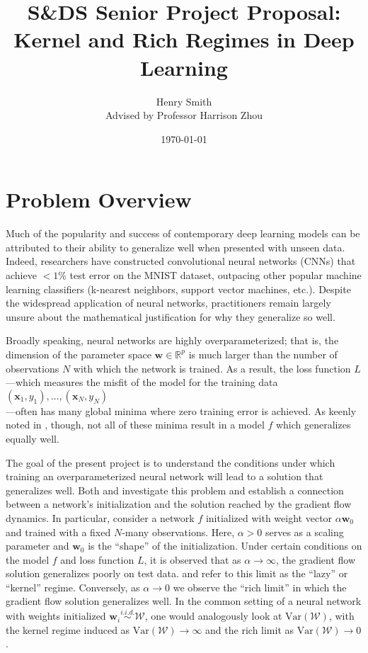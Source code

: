 \documentclass{article}
\title{\textbf{S\&DS Senior Project Proposal: \\Kernel and Rich Regimes in Deep Learning}}
\author[]{Henry Smith \\
Advised by Professor Harrison Zhou}
\affil[]{\normalsize Yale University}
\date{\today}
\begin{document}
\maketitle

\section{Problem Overview}
Much of the popularity and success of contemporary deep learning models can be attributed to their ability to generalize well when presented with unseen data. Indeed, researchers have constructed convolutional neural networks (CNNs) that achieve $< 1$\% test error on the MNIST dataset, outpacing other popular machine learning classifiers (k-nearest neighbors, support vector machines, etc.). Despite the widespread application of neural networks, practitioners remain largely unsure about the mathematical justification for why they generalize so well. 

Broadly speaking, neural networks are highly overparameterized; that is, the dimension of the parameter space $\boldsymbol{w} \in \mathbb{R}^p$ is much larger than the number of observations $N$ with which the network is trained. As a result, the loss function $L$—which measures the misfit of the model for the training data $(\boldsymbol{x}_1, y_1), \ldots, (\boldsymbol{x}_N, y_N)$\\—often has many global minima where zero training error is achieved. As keenly noted in \cite{woodworth2020kernel}, though, not all of these minima result in a model $f$ which generalizes equally well.

The goal of the present project is to understand the conditions under which training an overparameterized neural network will lead to a solution that generalizes well. Both \cite{chizat2018lazy} and \cite{woodworth2020kernel} investigate this problem and establish a connection between a network's initialization and the solution reached by the gradient flow dynamics. In particular, consider a network $f$ initialized with weight vector $\alpha \boldsymbol{w}_0$ and trained with a fixed $N$-many observations. Here, $\alpha > 0$ serves as a scaling parameter and $\boldsymbol{w}_0$ is the \enquote{shape} of the initialization. Under certain conditions on the model $f$ and loss function $L$, it is observed that as $\alpha \rightarrow \infty$, the gradient flow solution generalizes poorly on test data. \cite{chizat2018lazy} and \cite{woodworth2020kernel} refer to this limit as the \enquote{lazy} or \enquote{kernel} regime. Conversely, as $\alpha \rightarrow 0$ we observe the \enquote{rich limit} in which the gradient flow solution generalizes well. In the common setting of a neural network with weights initialized $\boldsymbol{w}_i \overset{i.i.d.}{\sim} \mathcal{W}$, one would analogously look at $\text{Var}(\mathcal{W})$, with the kernel regime induced as $\text{Var}(\mathcal{W}) \rightarrow \infty$ and the rich limit as $\text{Var}(\mathcal{W}) \rightarrow 0$.
\end{document}
